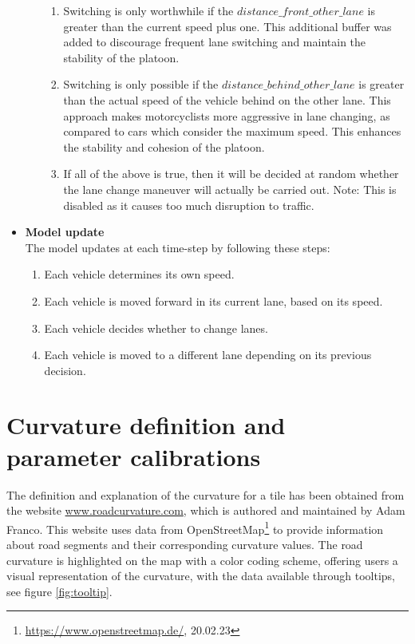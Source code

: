 \begin{itemize}
\begin{itemize}
\begin{enumerate}
         \item Switching is only worthwhile if the $distance\_front\_other\_lane$ is greater than the current speed plus one. This additional buffer was added to discourage frequent lane switching and maintain the stability of the platoon.
         \item Switching is only possible if the $distance\_behind\_other\_lane$ is greater than the actual speed of the vehicle behind on the other lane. This approach makes motorcyclists more aggressive in lane changing, as compared to cars which consider the maximum speed. This enhances the stability and cohesion of the platoon.
         \item If all of the above is true, then it will be decided at random whether the lane change maneuver will actually be carried out. Note: This is disabled as it causes too much disruption to traffic.
         \end{enumerate}  
     \end{itemize}

     \item \textbf{Model update}\\
     The model updates at each time-step by following these steps:
     \begin{enumerate}
         \item Each vehicle determines its own speed.
         \item Each vehicle is moved forward in its current lane, based on its speed.
         \item Each vehicle decides whether to change lanes.
         \item Each vehicle is moved to a different lane depending on its previous decision.
     \end{enumerate}
 \end{itemize}

 \section{Curvature definition and parameter calibrations}
 \label{sec:Curvature definition and parameter calibration}
The definition and explanation of the curvature for a tile has been obtained from the website \hyperlink{}{www.roadcurvature.com}, which is authored and maintained by Adam Franco\cite{roadcurvature.com}.
This website uses data from OpenStreetMap\textsuperscript{\textcopyright}\footnote{\hyperlink{}{https://www.openstreetmap.de/}, 20.02.23} to provide information about road segments and their corresponding curvature values. The road curvature is highlighted on the map with a color coding scheme, offering users a visual representation of the curvature, with the data available through tooltips, see figure \ref{fig:tooltip}.

